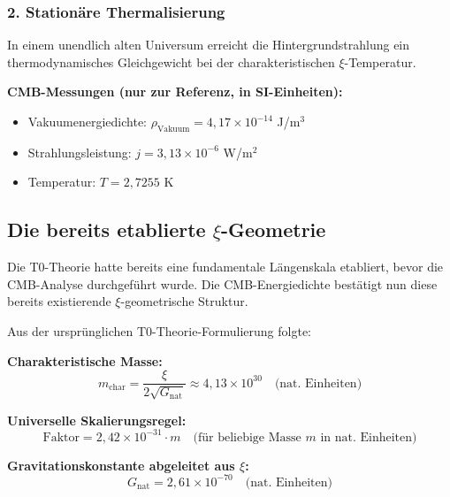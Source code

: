 	\subsubsection{2. Stationäre Thermalisierung}
	In einem unendlich alten Universum erreicht die Hintergrundstrahlung ein thermodynamisches Gleichgewicht bei der charakteristischen $\xi$-Temperatur.
	
	\begin{sibox}
		\textbf{CMB-Messungen (nur zur Referenz, in SI-Einheiten):}
		\begin{itemize}
			\item Vakuumenergiedichte: $\rho_{\text{Vakuum}} = 4,17 \times 10^{-14}$ J/m$^3$
			\item Strahlungsleistung: $j = 3,13 \times 10^{-6}$ W/m$^2$
			\item Temperatur: $T = 2,7255$ K
		\end{itemize}
	\end{sibox}
	
	\subsection{Die bereits etablierte $\xi$-Geometrie}
	
	\begin{important}
		Die T0-Theorie hatte bereits eine fundamentale Längenskala etabliert, bevor die CMB-Analyse durchgeführt wurde. Die CMB-Energiedichte bestätigt nun diese bereits existierende $\xi$-geometrische Struktur.
	\end{important}
	
	Aus der ursprünglichen T0-Theorie-Formulierung folgte:
	
	\textbf{Charakteristische Masse:}
	\begin{equation}
		m_{\text{char}} = \frac{\xi}{2\sqrt{G_{\text{nat}}}} \approx 4,13 \times 10^{30} \quad \text{(nat. Einheiten)}
	\end{equation}
	
	\textbf{Universelle Skalierungsregel:}
	\begin{equation}
		\text{Faktor} = 2,42 \times 10^{-31} \cdot m \quad \text{(für beliebige Masse } m \text{ in nat. Einheiten)}
	\end{equation}
	
	\textbf{Gravitationskonstante abgeleitet aus $\xi$:}
	\begin{equation}
		G_{\text{nat}} = 2,61 \times 10^{-70} \quad \text{(nat. Einheiten)}
	\end{equation}
	
